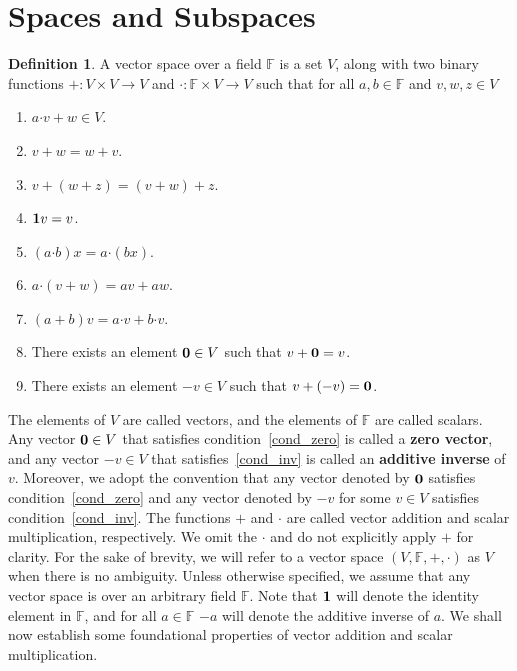 \documentclass[oneside, 12pt]{book}
\theoremstyle{definition}
\newtheorem{defn}{Definition}[section]
\begin{document}
\section{Spaces and Subspaces}
\begin{defn}
\label{defn_vspace}
A vector space over a field $\mathbb{F}$ is a set $V$, along with two binary functions $+: V \times V \to  V$ and $\boldsymbol{\cdot}: \mathbb{F} \times V \to V$ such that for all $a, b \in \mathbb{F}$ and $v,w,z \in V$
  \begin{enumerate}
    \item $a\boldsymbol{\cdot}v+w \in V$.
    \item $v+w=w+v$.
    \item $v+(w+z)=(v+w)+z$.
    \item $\bold{1}v=v$.
    \item $(a\boldsymbol{\cdot}b)x=a\boldsymbol{\cdot}(bx)$.
    \item $a\boldsymbol{\cdot}(v+w)=av+aw$.
    \item $(a+b)v=a\boldsymbol{\cdot}v+b\boldsymbol{\cdot}v$.
    \item There exists an element $\bold{0} \in V$ such that $v+\bold{0}=v$. \label{cond_zero}
    \item There exists an element $-v \in V$ such that $v+(-v)=\bold{0}$. \label{cond_inv}
  \end{enumerate}
\end{defn}
The elements of $V$ are called vectors, and the elements of $\mathbb{F}$ are called scalars. Any vector $\bold{0} \in V$ that satisfies condition~\ref{cond_zero} is called a \textbf{zero vector}, and any vector $-v \in V$ that satisfies~\ref{cond_inv} is called an \textbf{additive inverse} of $v$. Moreover, we adopt the convention that any vector denoted by $\bold{0}$ satisfies condition~\ref{cond_zero} and any vector denoted by $-v$ for some $v \in V$ satisfies condition~\ref{cond_inv}. The functions $+$ and $\boldsymbol{\cdot}$ are called vector addition and scalar multiplication, respectively. We omit the $\boldsymbol{\cdot}$ and do not explicitly apply $+$ for clarity. For the sake of brevity, we will refer to a vector space $(V, \mathbb{F}, +, \boldsymbol{\cdot})$ as $V$ when there is no ambiguity. Unless otherwise specified, we assume that any vector space is over an arbitrary field $\mathbb{F}$. Note that $\bold{1}$ will denote the identity element in $\mathbb{F}$, and for all $a \in \mathbb{F}$ $-a$ will denote the additive inverse of $a$. We shall now establish some foundational properties of vector addition and scalar multiplication.
\end{document}
